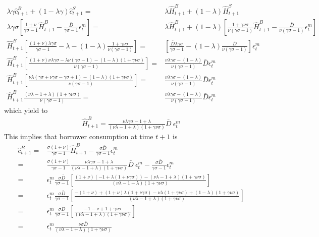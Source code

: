 \documentclass[a4paper,12pt]{article}%
\begin{document}
\begin{align*}
\lambda \gamma  \hat{c}^B_{t+1}+(1-\lambda \gamma) \hat{c}^S_{t+1} =&\lambda  \hat{H}^B_{t+1}+(1-\lambda) \hat{H}^S_{t+1}\\
\lambda \gamma \sigma\left[\frac{1+\nu}{\gamma\sigma-1} \hat{H}^B_{t+1} - \frac{\bar{D}}{\gamma\sigma-1} \epsilon^m_{t}  \right] =&\lambda  \hat{H}^B_{t+1}+(1-\lambda) \left[ \frac{1+\gamma\nu\sigma}{\nu(\gamma\sigma-1)} \hat{H}^B_{t+1} - \frac{\bar{D}}{\nu(\gamma\sigma-1)} \epsilon^m_{t}\right]\\
\hat{H}^B_{t+1}\left[\frac{(1+\nu)\lambda \gamma \sigma}{\gamma\sigma-1}  - \lambda  - (1-\lambda) \frac{1+\gamma\nu\sigma}{\nu(\gamma\sigma-1)}  \right] =& \left[\frac{\bar{D}\lambda \gamma \sigma}{\gamma\sigma-1} -  (1-\lambda) \frac{\bar{D}}{\nu(\gamma\sigma-1)} \right]\epsilon^m_{t}\\
\hat{H}^B_{t+1}\left[\frac{(1+\nu)\nu \lambda \gamma \sigma  - \lambda\nu(\gamma\sigma-1) - (1-\lambda) (1+\gamma\nu\sigma)}{\nu(\gamma\sigma-1)}   \right] =& \frac{\nu \lambda \gamma \sigma-(1-\lambda)}{ \nu(\gamma\sigma-1)} \bar{D}\epsilon^m_{t}\\
\hat{H}^B_{t+1}\left[\frac{\nu \lambda ( \gamma \sigma+\nu \gamma \sigma  - \gamma\sigma+1) - (1-\lambda) (1+\gamma\nu\sigma)}{\nu(\gamma\sigma-1)}   \right] =& \frac{\nu \lambda \gamma \sigma-(1-\lambda)}{ \nu(\gamma\sigma-1)} \bar{D}\epsilon^m_{t}\\
\hat{H}^B_{t+1} \frac{ (\nu \lambda -1+\lambda) (1+\gamma\nu\sigma)}{\nu(\gamma\sigma-1)} =& \frac{\nu \lambda \gamma \sigma-(1-\lambda)}{ \nu(\gamma\sigma-1)} \bar{D}\epsilon^m_{t}
\end{align*}
which yield to
\begin{align}
\hat{H}^B_{t+1} = \frac{\nu \lambda \gamma \sigma- 1 +\lambda}{ (\nu \lambda -1+\lambda) (1+\gamma\nu\sigma)} \bar{D}\ \epsilon^m_{t} \label{cvd:t2}
\end{align}
This implies that borrower consumption at time $t+1$ is
\begin{align*}
\hat{c}^B_{t+1} =&  \frac{\sigma(1+\nu)}{\gamma\sigma-1} \hat{H}^B_{t+1} - \frac{\sigma\bar{D}}{\gamma\sigma-1} \epsilon^m_{t}\\
=& \frac{\sigma(1+\nu)}{\gamma\sigma-1}  \frac{\nu \lambda \gamma \sigma- 1 +\lambda}{ (\nu \lambda -1+\lambda) (1+\gamma\nu\sigma)} \bar{D}\ \epsilon^m_{t} - \frac{\sigma\bar{D}}{\gamma\sigma-1} \epsilon^m_{t}\\
=& \epsilon^m_{t} \frac{\sigma\bar{D}}{\gamma\sigma-1}  \left[ \frac{(1+\nu)(- 1 +\lambda(1+\nu \gamma \sigma) ) - (\nu \lambda -1+\lambda) (1+\gamma\nu\sigma)}{ (\nu \lambda -1+\lambda) (1+\gamma\nu\sigma)} \right]\\
=& \epsilon^m_{t} \frac{\sigma\bar{D}}{\gamma\sigma-1}  \left[ \frac{-(1+\nu) + (1+\nu)\lambda(1+\nu \gamma \sigma) - \nu \lambda(1+\gamma\nu\sigma) +(1-\lambda) (1+\gamma\nu\sigma)}{ (\nu \lambda -1+\lambda) (1+\gamma\nu\sigma)} \right]\\
=& \epsilon^m_{t} \frac{\sigma\bar{D}}{\gamma\sigma-1}  \left[ \frac{-1-\nu+ 1+\gamma\nu\sigma}{ (\nu \lambda -1+\lambda) (1+\gamma\nu\sigma)} \right]\\
=& \epsilon^m_{t} \frac{\nu\sigma\bar{D}}{ (\nu \lambda -1+\lambda) (1+\gamma\nu\sigma)} 
\end{align*}
\end{document}
